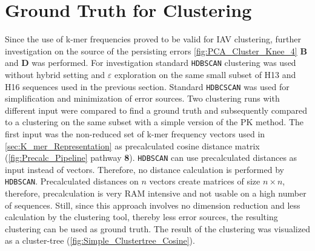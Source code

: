 \section{Ground Truth for Clustering} \label{sec:Comparison_Clustering}

Since the use of k-mer frequencies proved to be valid for \gls{IAV} clustering, further investigation on the source of the persisting errors \autoref{fig:PCA_Cluster_Knee_4} \textbf{\textsf{B}} and \textbf{\textsf{D}} was performed. For investigation standard \texttt{HDBSCAN} clustering was used without hybrid setting and $\varepsilon$ exploration on the same small subset of H13 and H16 sequences used in the previous section. Standard \texttt{HDBCSCAN} was used for simplification and minimization of error sources. Two clustering runs with different input were compared to find a ground truth and subsequently compared to a clustering on the same subset with a simple version of the PK method. The first input was the non-reduced set of k-mer frequency vectors used in \autoref{sec:K_mer_Representation} as precalculated cosine distance matrix (\autoref{fig:Precalc_Pipeline} pathway \textsf{\textbf{8}}). \texttt{HDBSCAN} can use precalculated distances as input instead of vectors. Therefore, no distance calculation is performed by \texttt{HDBSCAN}. Precalculated distances on $n$ vectors create matrices of size $n \times n$, therefore, precalculation is very RAM intensive and not usable on a high number of sequences. Still, since this approach involves no dimension reduction and less calculation by the clustering tool, thereby less error sources, the resulting clustering can be used as ground truth. The result of the clustering was visualized as a cluster-tree (\autoref{fig:Simple_Clustertree_Cosine}). 

